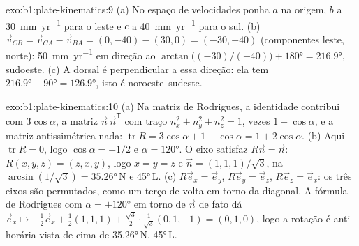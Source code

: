 \begin{solution}{exo:b1:plate-kinematics:9}
(a) No espaço de velocidades ponha $a$ na origem, $b$ a \qty{30}{mm.yr^{-1}} para o
leste e $c$ a \qty{40}{mm.yr^{-1}} para o sul. (b) $\vec v_{CB} =
\vec v_{CA} - \vec v_{BA} = (0, -40) - (30, 0) = (-30, -40)$ (componentes leste, norte):
\qty{50}{mm.yr^{-1}} em direção ao 
$\arctan\bigl((-30)/(-40)\bigr) + \ang{180} = \ang{216.9}$, sudoeste. (c) A
dorsal é perpendicular a essa direção: ela tem 
$\ang{216.9} - \ang{90} = \ang{126.9}$, isto é noroeste--sudeste.
\end{solution}

\begin{solution}{exo:b1:plate-kinematics:10}
(a) Na matriz de Rodrigues, a identidade contribui com $3\cos\alpha$, a matriz
$\vec n\,\vec n^{\mathsf T}$ com traço $n_x^2 + n_y^2 + n_z^2 = 1$, vezes
$1 - \cos\alpha$, e a matriz antissimétrica nada: $\operatorname{tr}R =
3\cos\alpha + 1 - \cos\alpha = 1 + 2\cos\alpha$. (b) Aqui $\operatorname{tr}R = 0$,
logo $\cos\alpha = -1/2$ e $\alpha = \ang{120}$. O eixo satisfaz $R\vec n =
\vec n$: $R(x, y, z) = (z, x, y)$, logo $x = y = z$ e $\vec n =
(1, 1, 1)/\sqrt3$, na  $\arcsin(1/\sqrt3) = \ang{35.26}$\,N e
 \ang{45}\,L. (c) $R\vec e_x = \vec e_y$, $R\vec e_y = \vec e_z$,
$R\vec e_z = \vec e_x$: os três eixos são permutados, como um terço de volta em torno
da diagonal. A fórmula de Rodrigues com $\alpha = +\ang{120}$ em torno de $\vec n$
de fato dá $\vec e_x\mapsto -\tfrac12\vec e_x + \tfrac12(1, 1, 1) +
\tfrac{\sqrt3}{2}\cdot\tfrac{1}{\sqrt3}(0, 1, -1) = (0, 1, 0)$, logo a rotação
é anti-horária vista de cima de \ang{35.26}\,N, \ang{45}\,L.
\end{solution}

